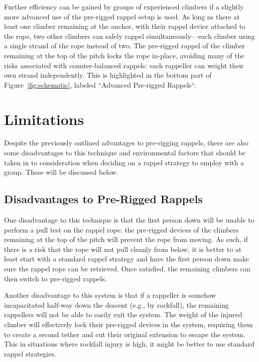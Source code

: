 \documentclass[nonacm,acmtog]{acmart}
\begin{document}
  Further efficiency can be gained by groups of experienced climbers if a
  slightly more advanced use of the pre-rigged rappel setup is used.  As long
  as there at least one climber remaining at the anchor, with their rappel device
  attached to the rope, two other climbers can safely rappel
  simultaneously---each climber using a single strand of the rope instead of
  two.  The pre-rigged rappel of the climber remaining at the top of the pitch
  locks the rope in-place, avoiding many of the risks associated with
  counter-balanced rappels: each rappeller can weight their own strand
  independently.  This is highlighted in the bottom part of
  Figure~\ref{fig:schematic}, labeled ``Advanced Pre-rigged Rappels``.


\section{Limitations}
\label{sec:limitations}

  Despite the previously outlined advantages to pre-rigging rappels, there are
  also some disadvantages to this technique and environmental factors that
  should be taken in to consideration when deciding on a rappel strategy to
  employ with a group.  These will be discussed below.

\subsection{Disadvantages to Pre-Rigged Rappels}

  One disadvantage to this technique is that the first person down will be
  unable to perform a pull test on the rappel rope: the pre-rigged devices of
  the climbers remaining at the top of the pitch will prevent the rope from
  moving.  As such, if there is a risk that the rope will not pull cleanly from
  below, it is better to at least start with a standard rappel strategy and
  have the first person down make sure the rappel rope can be retrieved.  Once
  satisfied, the remaining climbers can then switch to pre-rigged rappels.

  Another disadvantage to this system is that if a rappeller is somehow
  incapacitated half-way down the descent (e.g., by rockfall), the remaining
  rappellers will not be able to easily exit the system.  The weight of the
  injured climber will effectively lock their pre-rigged devices in the system,
  requiring them to create a second tether and cut their original extension to
  escape the system.  This in situations where rockfall injury is high, it
  might be better to use standard rappel strategies.
\end{document}
